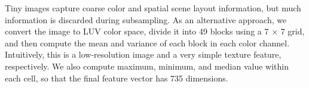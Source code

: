  Tiny images capture coarse color and spatial
scene layout information, but much information is discarded during
subsampling.  As an alternative approach, we convert the image to LUV
color space, divide it into 49 blocks using a 7 $\times$ 7 grid, and
then compute the mean and variance of each block in each color
channel.  Intuitively, this is a low-resolution image and a very
simple texture feature, respectively.  We also compute maximum,
minimum, and median value within each cell, so that the final
feature vector has 735 dimensions.





